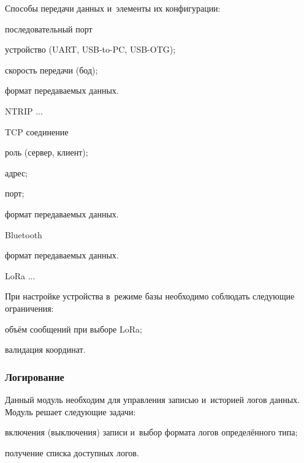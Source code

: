 Способы передачи данных и~элементы их конфигурации:
\begin{dashitemize}
  \item последовательный порт
  \begin{dashitemize}
    \item устройство (UART, USB-to-PC, USB-OTG);
    \item скорость передачи (бод);
    \item формат передаваемых данных.
  \end{dashitemize}

  \item NTRIP ...

  \item TCP соединение
  \begin{dashitemize}
    \item роль (сервер, клиент);
    \item адрес;
    \item порт;
    \item формат передаваемых данных.
  \end{dashitemize}

  \item Bluetooth
  \begin{dashitemize}
    \item формат передаваемых данных.
  \end{dashitemize}

  \item LoRa ...
\end{dashitemize}

При настройке устройства в~режиме базы необходимо соблюдать следующие ограничения:
\begin{dashitemize}
  \item объём сообщений при выборе LoRa;
  \item валидация координат.
\end{dashitemize}

\subsubsection{Логирование}

Данный модуль необходим для управления записью и~историей логов данных. Модуль решает следующие задачи:
\begin{dashitemize}
  \item включения (выключения) записи и~выбор формата логов определённого типа;
  \item получение списка доступных логов.
\end{dashitemize}

